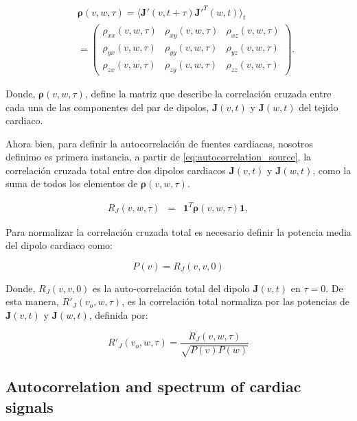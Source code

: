  \begin{eqnarray}\label{eq:autocorrelation_source}
 &&\boldsymbol{\rho}(v,w,\tau)=\langle\mathbf{J'}(v,t+\tau)\mathbf{J'}^{T}(w,t)\rangle_t
 \nonumber \\
 &&= \left( \begin{array}{ccc}
 {\rho}_{xx}(v,w,\tau) & {\rho}_{xy}(v,w,\tau) & {\rho}_{xz}(v,w,\tau) \\
 {\rho}_{yx}(v,w,\tau) & {\rho}_{yy}(v,w,\tau) & {\rho}_{yz}(v,w,\tau) \\
 {\rho}_{zx}(v,w,\tau) & {\rho}_{zy}(v,w,\tau) & {\rho}_{zz}(v,w,\tau)
 \end{array} \right).
 \end{eqnarray}

Donde, $\boldsymbol{\rho}(v,w,\tau)$, define la matriz  que describe la
correlación cruzada entre cada una de las componentes del par de dipolos,
$\mathbf{J}(v,t)$ y $\mathbf{J}(w,t)$ del  tejido cardiaco.

Ahora bien, para definir la autocorrelación de fuentes cardiacas,  nosotros
definimo es primera instancia, a partir de \ref{eq:autocorrelation_source}, la
correlación cruzada  total  entre dos dipolos cardiacos $\mathbf{J}(v,t)$ y
$\mathbf{J}(w,t)$, como la suma de todos los elementos de $\boldsymbol{\rho}(v,w,\tau)$.

\begin{eqnarray}
  R_{J}(v,w,\tau) &=&  \mathbf{1}^{T} \boldsymbol{\rho}(v,w,\tau)
  \mathbf{1},\label{total_corr}
\end{eqnarray}



Para normalizar la correlación cruzada total es necesario definir la potencia
media del dipolo cardiaco como:

\begin{equation}\label{eq:Potencia}
{P}(v) = {R_{J}}(v,v,0)
\end{equation}

Donde, ${R_{J}}(v,v,0)$  es la auto-correlación total del dipolo $\mathbf{J}(v,t)$ en $\tau=0$.
De esta manera, ${R'}_{J}(v_o,w,\tau)$, es la correlación total normaliza por
las potencias de  $\mathbf{J}(v,t)$ y $\mathbf{J}(w,t)$, definida  por:

\begin{equation}\label{eq:RjN}
 {R'_{J}}(v_o,w,\tau)=\dfrac{{R_{J}}(v,w,\tau)}{\sqrt{P(v)P(w)}}
\end{equation}



\subsection{Autocorrelation and spectrum of cardiac signals}

